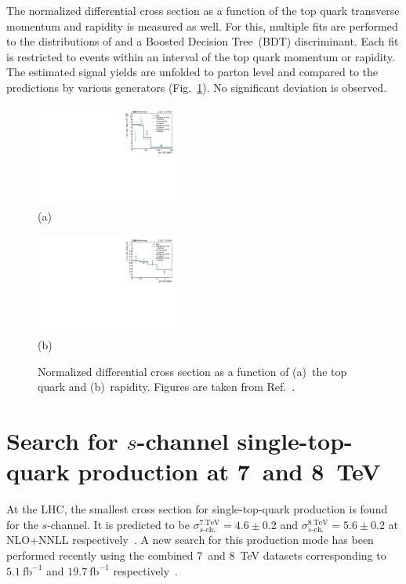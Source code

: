 \documentclass{PoS}
\begin{document}
The normalized differential cross section as a function of the top quark transverse momentum and rapidity is measured as well. For this, multiple fits are performed to the distributions of \mtw and a Boosted Decision Tree~(BDT) discriminant. Each fit is restricted to events within an interval of the top quark momentum or rapidity. The estimated signal yields are unfolded to parton level and compared to the predictions by various generators (Fig.~\ref{fig:TOP-16-004-unfolded}). No significant deviation is observed.

\begin{figure}[htbp]
\begin{center}
\parbox[t]{0.49\textwidth}{\centering\includegraphics[width=0.42\textwidth]{figures/tchannel_diff/top_pt_unfolded.pdf}\\(a)}
\parbox[t]{0.49\textwidth}{\centering\includegraphics[width=0.42\textwidth]{figures/tchannel_diff/top_y_unfolded.pdf}\\(b)}
\caption{\label{fig:TOP-16-004-unfolded}Normalized differential cross section as a function of (a)~the top quark \pt and (b)~rapidity. Figures are taken from Ref.~\cite{CMS-PAS-TOP-16-004}.}
\end{center}
\end{figure}



\section{Search for $s$-channel single-top-quark production at 7~and 8~TeV}
At the LHC, the smallest cross section for single-top-quark production is found for the $s$-channel. It is predicted to be $\sigma_{s\mbox{-}\mathrm{ch.}}^\mathrm{7~TeV}=4.6\pm0.2$ and $\sigma_{s\mbox{-}\mathrm{ch.}}^\mathrm{8~TeV}=5.6\pm0.2$ at NLO+NNLL respectively~\cite{schannel-xsec}. A new search for this production mode has been performed recently using the combined 7~and 8~TeV datasets corresponding to $5.1~\mathrm{fb}^{-1}$ and $19.7~\mathrm{fb}^{-1}$ respectively~\cite{CMS-PAS-TOP-13-009}.
\end{document}

